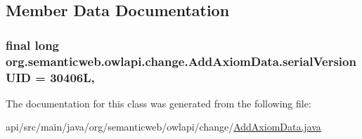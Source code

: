 \subsection{Member Data Documentation}
\hypertarget{classorg_1_1semanticweb_1_1owlapi_1_1change_1_1_add_axiom_data_a12c0209bc0077c3bc77d5b05eb472a57}{
\subsubsection[{serial\-Version\-U\-I\-D}]{\setlength{\rightskip}{0pt plus 5cm}final long org.\-semanticweb.\-owlapi.\-change.\-Add\-Axiom\-Data.\-serial\-Version\-U\-I\-D = 30406\-L\hspace{0.3cm}{\ttfamily [static]}, {\ttfamily [private]}}}\label{classorg_1_1semanticweb_1_1owlapi_1_1change_1_1_add_axiom_data_a12c0209bc0077c3bc77d5b05eb472a57}


The documentation for this class was generated from the following file\-:\begin{DoxyCompactItemize}
\item 
api/src/main/java/org/semanticweb/owlapi/change/\hyperlink{_add_axiom_data_8java}{Add\-Axiom\-Data.\-java}\end{DoxyCompactItemize}
